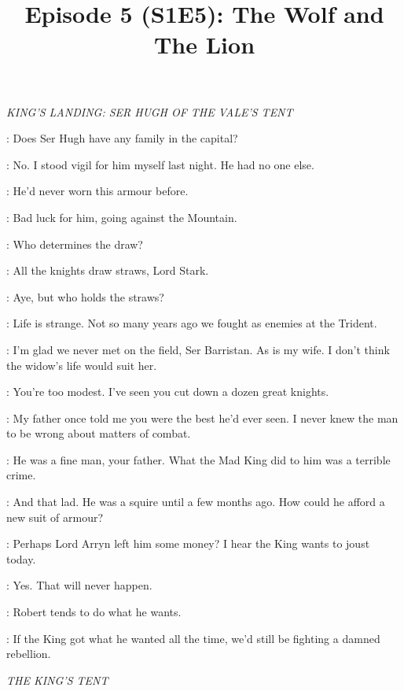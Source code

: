 

\title{Episode 5 (S1E5): The Wolf and The Lion}
\author{}
\date{}
\maketitle




\scene

\textit{KING'S LANDING: SER HUGH OF THE VALE'S TENT} 


\NED: Does Ser Hugh have any family in the capital? 

\SELMY: No. I stood vigil for him myself last night. He had no one else. 

\NED: He'd never worn this armour before. 

\SELMY: Bad luck for him, going against the Mountain. 

\NED: Who determines the draw? 

\SELMY: All the knights draw straws, Lord Stark. 

\NED: Aye, but who holds the straws?

\SELMY: Life is strange. Not so many years ago we fought as enemies at the Trident. 

\NED: I'm glad we never met on the field, Ser Barristan. As is my wife. I don't think the widow's life would suit her. 

\SELMY: You're too modest. I've seen you cut down a dozen great knights. 

\NED: My father once told me you were the best he'd ever seen. I never knew the man to be wrong about matters of combat. 

\SELMY: He was a fine man, your father. What the Mad King did to him was a terrible crime. 

\NED: And that lad. He was a squire until a few months ago. How could he afford a new suit of armour? 

\SELMY: Perhaps Lord Arryn left him some money? I hear the King wants to joust today. 

\NED: Yes. That will never happen. 

\SELMY: Robert tends to do what he wants. 

\NED: If the King got what he wanted all the time, we'd still be fighting a damned rebellion. 


\scene

\textit{THE KING'S TENT} 

